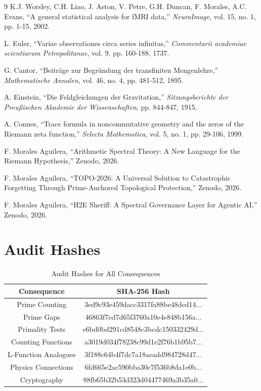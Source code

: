 \documentclass[12pt,a4paper]{article}
\begin{document}
\begin{thebibliography}{9}
K.J. Worsley, C.H. Liao, J. Aston, V. Petre, G.H. Duncan, F. Morales, A.C. Evans,
``A general statistical analysis for fMRI data,''
\textit{NeuroImage}, vol. 15, no. 1, pp. 1-15, 2002.

L. Euler,
``Variae observationes circa series infinitas,''
\textit{Commentarii academiae scientiarum Petropolitanae}, vol. 9, pp. 160-188, 1737.

G. Cantor,
``Beitr\"age zur Begr\"undung der transfiniten Mengenlehre,''
\textit{Mathematische Annalen}, vol. 46, no. 4, pp. 481-512, 1895.

A. Einstein,
``Die Feldgleichungen der Gravitation,''
\textit{Sitzungsberichte der Preu\ss{}ischen Akademie der Wissenschaften}, pp. 844-847, 1915.

A. Connes,
``Trace formula in noncommutative geometry and the zeros of the Riemann zeta function,''
\textit{Selecta Mathematica}, vol. 5, no. 1, pp. 29-106, 1999.

F. Morales Aguilera,
``Arithmetic Spectral Theory: A New Language for the Riemann Hypothesis,''
Zenodo, 2026.

F. Morales Aguilera,
``TOPO-2026: A Universal Solution to Catastrophic Forgetting Through Prime-Anchored Topological Protection,''
Zenodo, 2026.

F. Morales Aguilera,
``H2E Sheriff: A Spectral Governance Layer for Agentic AI,''
Zenodo, 2026.
\end{thebibliography}

\appendix
\section{Audit Hashes}

\begin{table}[htbp]
\centering
\begin{tabular}{cc}
\toprule
Consequence & SHA-256 Hash \\
\midrule
Prime Counting & 3ed9c93e459dacc3317fa88be48ded14... \\
Prime Gaps & 46863f7cd7d65f3760a10e4e848b156a... \\
Primality Tests & e6bd0bd291cd8548c3bcdc150332429d... \\
Counting Functions & a3019d034f78238c99d1e2f76b1b95b7... \\
L-Function Analogues & 3f188c64b4f7dc7a18aeadd984728d47... \\
Physics Connections & 6fd665e2ac590bba30c7f536b8da1e0b... \\
Cryptography & 88fb65b32b53d323d04477469a3b35a0... \\
\bottomrule
\end{tabular}
\caption{Audit Hashes for All Consequences}
\label{app:hashes}
\end{table}
\end{document}
